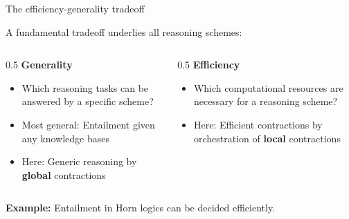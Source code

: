 \documentclass{beamer}
\begin{document}
    \begin{frame}{The efficiency-generality tradeoff}

        \begin{center}
            {A fundamental tradeoff underlies all reasoning schemes:}
        \end{center}
        \begin{columns}[t] %

            \begin{column}{0.5\textwidth}
                \centering \textbf{Generality}
                \begin{itemize}
                    \item Which reasoning tasks can be answered by a specific scheme?
                    \item Most general: Entailment given any knowledge bases
                    \item Here: Generic reasoning by {\bf global} contractions
                \end{itemize}
            \end{column}

            \begin{column}{0.5\textwidth}
                \centering \textbf{Efficiency}
                \begin{itemize}
                    \item Which computational resources are necessary for a reasoning scheme?
                    \item Here: Efficient contractions by orchestration of {\bf local} contractions
                \end{itemize}
            \end{column}

        \end{columns}
        \par \medskip
        \vspace{0.5cm}
        {\bf Example:} Entailment in Horn logics can be decided efficiently.

%
    \end{frame}
\end{document}
